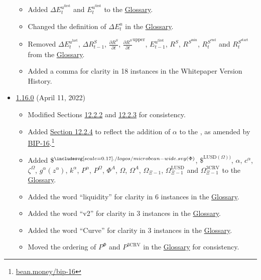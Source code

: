 \documentclass[class=article, crop=false]{standalone}
\begin{document}
\begin{itemize}[topsep=0pt, itemsep=3pt,leftmargin=16pt]
\begin{itemize}
        \item Added  $\Delta E_{t}^{u^{\text{first}}}$ and $E_{t}^{u^{\text{first}}}$ to the \hyperlink{subsection.14.11}{Glossary}. 
        \item Changed the definition of $\Delta E_{t}^{u}$ in the \hyperlink{subsection.14.11}{Glossary}. 
        \item Removed $\Delta E_{t}^{u^{\text{last}}}$, $\Delta R_{t-1}^S$, $\frac{\partial R^S}{\partial t}$, $\frac{\partial R^S}{\partial t}^{\text{upper}}$, $E_{t-1}^{u^{\text{first}}}$, $R^S$, $R^{S^{\text{min}}}$, $R_t^{S^{\text{end}}}$ and $R_t^{S^{\text{start}}}$ from the \hyperlink{subsection.14.11}{Glossary}.
        \item Added a comma for clarity in 18 instances in the Whitepaper Version History.
    \end{itemize}  
        \item \href{https://github.com/BeanstalkFarms/Beanstalk-Whitepaper/blob/master/version-history/beanstalk1_16_0.pdf}{1.16.0} (April 11, 2022)
    \begin{itemize}
        \item Modified Sections \hyperlink{subsubsection.12.2.3}{12.2.2} and \hyperlink{subsubsection.12.2.3}{12.2.3} for consistency.
        \item Added \hyperlink{subsubsection.12.2.4}{Section 12.2.4} to reflect the addition of $\alpha$ to the  , as amended by \href{https://bean.money/bip-16}{BIP-16}.\footnote{\href{https://bean.money/bip-16}{bean.money/bip-16}} 
        \item Added  $\$^{\bean(\Phi)}$, $\$^{\text{LUSD}(\Omega))}$, $\alpha$, $c^{\alpha}$, $\zeta^{\Omega}$, $g^{\alpha}(z^{\alpha})$, $k^{\alpha}$, $P^{\alpha}$, $P^{\Omega}$, $\Phi^{A}$, $\Omega$, $\Omega^{A}$, $\Omega_{\Xi-1}$, $\Omega_{\Xi-1}^{\text{LUSD}}$ and $\Omega_{\Xi-1}^{\text{3CRV}}$ to the \hyperlink{subsection.14.11}{Glossary}. 
        \item Added the word ``liquidity'' for clarity in 6 instances in the \hyperlink{subsection.14.11}{Glossary}.
        \item Added the word ``v2'' for clarity in 3 instances in the \hyperlink{subsection.14.11}{Glossary}.
        \item Added the word ``Curve'' for clarity in 3 instances in the \hyperlink{subsection.14.11}{Glossary}.
        \item Moved the ordering of $P^{\Phi}$ and $P^{\text{3CRV}}$ in the \hyperlink{subsection.14.11}{Glossary} for consistency. 

\end{itemize}
\end{itemize}
\end{document}
